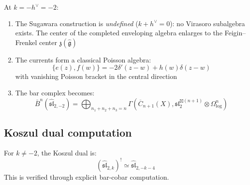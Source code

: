 \begin{theorem}\label{thm:sl2-critical}
At $k = -h^\vee = -2$:
\begin{enumerate}
\item The Sugawara construction is \emph{undefined} ($k + h^\vee = 0$): no Virasoro subalgebra exists. The center of the completed enveloping algebra enlarges to the Feigin--Frenkel center $\mathfrak{z}(\widehat{\mathfrak{g}})$
\item The currents form a classical Poisson algebra:
\begin{equation}
\{e(z), f(w)\} = -2\delta'(z-w) + h(w)\delta(z-w)
\end{equation}
with vanishing Poisson bracket in the central direction
\item The bar complex becomes:
\begin{equation}
\bar{B}^n(\widehat{\mathfrak{sl}}_{2,-2}) = \bigoplus_{n_1+n_2+n_3=n} \Gamma(\overline{C}_{n+1}(X), \mathfrak{sl}_2^{\boxtimes(n+1)} \otimes \Omega^n_{\log})
\end{equation}
\end{enumerate}
\end{theorem}

\subsection{Koszul dual computation}

\begin{theorem}\label{thm:sl2-koszul-dual}
For $k \neq -2$, the Koszul dual is:
\begin{equation}
(\widehat{\mathfrak{sl}}_{2,k})^! \simeq \widehat{\mathfrak{sl}}_{2,-k-4}
\end{equation}
This is verified through explicit bar-cobar computation.
\end{theorem}

